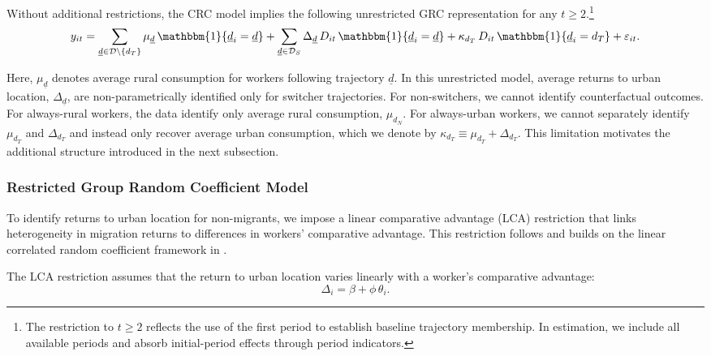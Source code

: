Without additional restrictions, the CRC model implies the following unrestricted GRC representation for any $t \ge 2$.\footnote{The restriction to $t \ge 2$ reflects the use of the first period to establish baseline trajectory membership. In estimation, we include all available periods and absorb initial-period effects through period indicators.}
\begin{equation}\label{eq:unrestricted-grc-model}
    y_{it}= \sum_{\underline d \in \mathcal D \setminus \{d_T\}}
    \mu_{\underline d}\,\mathbbm{1}\{ \underline d_i=\underline d \} + \sum_{\underline d \in \mathcal D_S}
    \Delta_{\underline d}\, D_{it}\,\mathbbm{1}\{ \underline d_i=\underline d \} + \kappa_{d_T}\, D_{it}\,\mathbbm{1}\{ \underline d_i=d_T \} + \varepsilon_{it}.
\end{equation}

Here, $\mu_{\underline d}$ denotes average rural consumption for workers following trajectory $\underline d$.
In this unrestricted model, average returns to urban location, $\Delta_{\underline d}$, are non-parametrically identified only for switcher trajectories.
For non-switchers, we cannot identify counterfactual outcomes. 
For always-rural workers, the data identify only average rural consumption, $\mu_{d_N}$.
For always-urban workers, we cannot separately identify $\mu_{d_T}$ and $\Delta_{d_T}$ and instead only recover average urban consumption, which we denote by $\kappa_{d_T} \equiv \mu_{d_T} + \Delta_{d_T}$.
This limitation motivates the additional structure introduced in the next subsection.

\subsubsection{Restricted Group Random Coefficient Model}\label{subsec:restricted-grc-model}

To identify returns to urban location for non-migrants, we impose a linear comparative advantage (LCA) restriction that links heterogeneity in migration returns to differences in workers' comparative advantage.
This restriction follows \cite{suriSelectionComparativeAdvantage2011} and builds on the linear correlated random coefficient framework in \cite{lemieuxEstimatingEffectsUnions1998}.

The LCA restriction assumes that the return to urban location varies linearly with a worker's comparative advantage:
\begin{equation}\label{eq:LCA-restriction}
\Delta_i = \beta + \phi\,\theta_i .
\end{equation}


